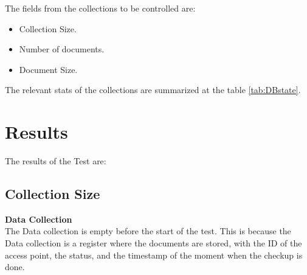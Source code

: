 \documentclass[12pt, a4paper,twoside]{tesi_upf}
\begin{document}
    
    The fields from the collections to be controlled are:
    \begin{itemize}
    \item Collection Size.
    \item Number of documents.
    \item Document Size.
    \end{itemize}
    
    The relevant stats of the collections are summarized at the table \ref{tab:DBstate}. 

        \begin{table}[H]
        \centering
        \caption{Summary Table of Collections Stats}
        \label{tab:DBstate}
        \end{table}
        
    
    \section{Results}
    The results of the Test are:
    \subsection{Collection Size}
    \textbf{Data Collection}\\
    The Data collection is empty before the start of the test. This is because the Data collection is a register where the documents are stored, with the ID of the access point, the status, and the timestamp of the moment when the checkup is done.
    
\end{document}
